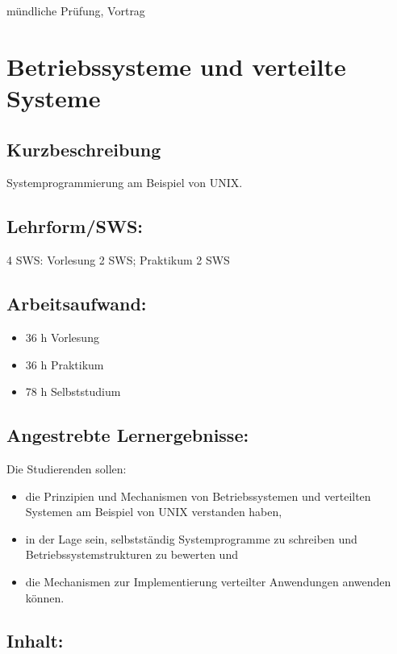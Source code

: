 mündliche Prüfung, Vortrag

\chapter{Betriebssysteme und verteilte
Systeme}\label{betriebssysteme-und-verteilte-systeme}

\section*{Kurzbeschreibung}\label{kurzbeschreibung}

Systemprogrammierung am Beispiel von UNIX.

\section*{Lehrform/SWS:}\label{lehrformsws-3}

4 SWS: Vorlesung 2 SWS; Praktikum 2 SWS

\section*{Arbeitsaufwand:}\label{arbeitsaufwand-3}

\begin{itemize}
\item
  36 h Vorlesung
\item
  36 h Praktikum
\item
  78 h Selbststudium
\end{itemize}

\section*{Angestrebte
Lernergebnisse:}\label{angestrebte-lernergebnisse-5}

Die Studierenden sollen:

\begin{itemize}
\item
  die Prinzipien und Mechanismen von Betriebssystemen und verteilten
  Systemen am Beispiel von UNIX verstanden haben,
\item
  in der Lage sein, selbstständig Systemprogramme zu schreiben und
  Betriebssystemstrukturen zu bewerten und
\item
  die Mechanismen zur Implementierung verteilter Anwendungen anwenden
  können.
\end{itemize}

\section*{Inhalt:}\label{inhalt-5}

